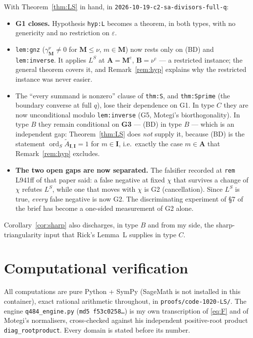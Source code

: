 \documentclass[11pt]{article}
\theoremstyle{plain}
\theoremstyle{definition}
\newcommand{\At}{\widetilde{A}}
\newcommand{\bA}{\mathbf{A}}
\newcommand{\bB}{\mathbf{B}}
\newcommand{\bI}{\mathbf{I}}
\newcommand{\bM}{\mathbf{M}}
\newcommand{\ord}{\operatorname{ord}}
\begin{document}
With Theorem~\ref{thm:LS} in hand, in \texttt{2026-10-19-c2-sa-divisors-full-q}:
\begin{itemize}[leftmargin=1.4em]
\item \textbf{G1 closes.}  Hypothesis \texttt{hyp:L} becomes a theorem, in both
  types, with no genericity and no restriction on $\varepsilon$.
\item \texttt{lem:gnz} ($\gamma^{\nu}_{\bM}\ne0$ for $\bM\le\nu$, $m\in\bM$) now
  rests only on (BD) and \texttt{lem:inverse}.  It applies $L^{S}$ at
  $\bA=\bM^{\mathrm c}$, $\bB=\nu^{\mathrm c}$ --- a restricted instance; the
  general theorem covers it, and Remark~\ref{rem:hyp} explains why the restricted
  instance was never easier.
\item The ``every summand is nonzero'' clause of \texttt{thm:S}, and
  \texttt{thm:Sprime} (the boundary converse at full $q$), lose their dependence
  on G1.  In type $C$ they are now unconditional modulo \texttt{lem:inverse}
  (G5, Motegi's biorthogonality).  In type $B$ they remain conditional on
  \textbf{G3} --- (BD) in type $B$ --- which is an independent gap:
  Theorem~\ref{thm:LS} does \emph{not} supply it, because (BD) is the statement
  $\ord_S\At_{\bI,\bI}=1$ for $m\in\bI$, i.e.\ exactly the case $m\in\bA$ that
  Remark~\ref{rem:hyp} excludes.
\item \textbf{The two open gaps are now separated.}  The falsifier recorded at
  \texttt{rem} L941ff of that paper said: a false negative at fixed $\chi$ that
  survives a change of $\chi$ refutes $L^{S}$, while one that moves with $\chi$ is
  G2 (cancellation).  Since $L^{S}$ is true, \emph{every} false negative is now
  G2.  The discriminating experiment of \S7 of the brief has become a
  one-sided measurement of G2 alone.
\end{itemize}
Corollary~\ref{cor:sharp} also discharges, in type $B$ and from my side, the
sharp-triangularity input that Rick's Lemma~L supplies in type $C$.

\section{Computational verification}
\label{sec:verif}

All computations are pure Python + SymPy (SageMath is not installed in this
container), exact rational arithmetic throughout, in
\texttt{proofs/code-1020-LS/}.  The engine \texttt{q484\_engine.py}
(\texttt{md5 f53c0258\dots}) is my own transcription of \eqref{eq:F} and of
Motegi's normalisers, cross-checked against his independent positive-root product
\texttt{diag\_rootproduct}.  Every domain is stated before its number.
\end{document}
